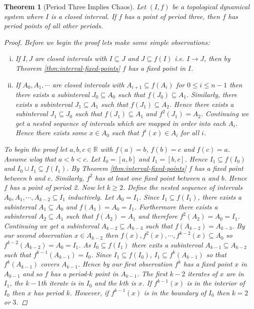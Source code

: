 \documentclass[11pt,a4paper,oneside]{memoir}
\theoremstyle{plain}
\newtheorem{thm}{Theorem}[chapter]
\theoremstyle{definition}
\begin{document}
\begin{thm}[Period Three Implies Chaos] \label{thm:period-three-chaos}
    Let $(I, f)$ be a topological dynamical system where $I$ is a closed interval. If $f$ has a point of period three, then $f$ has period points of all other periods.
    \begin{proof}
        Before we begin the proof lets make some simple observations:
        \begin{enumerate}[(i)]
            \item If $I, J$ are closed intervals with $I \subseteq J$ and $J \subseteq f(I)$ i.e. $I \to J$, then by Theorem \ref{thm:interval-fixed-points} $f$ has a fixed point in $I$.
            \item If $A_0, A_1, \cdots$ are closed intervals with $A_{i+1} \subseteq f(A_i)$ for $0 \leq i \leq n - 1$ then there exists a subinterval $J_0 \subseteq A_0$ such that $f(J_0) \subseteq A_1$. Similarly, there exists a subinterval $J_1 \subseteq A_1$ such that $f(J_1) \subseteq A_2$. Hence there exists a subinterval $J_1 \subseteq J_0$ such that $f(J_1) \subseteq A_1$ and $f^2(J_1) = A_2$. Continuing we get a nested sequence of intervals which are mapped in order into each $A_i$. Hence there exists some $x \in A_0$ such that $f^i(x) \in A_i$ for all $i$.
        \end{enumerate}
        To begin the proof let $a, b, c \in \mathbb{R}$ with $f(a) = b$, $f(b) = c$ and $f(c) = a$. Assume wlog that $a < b < c$. Let $I_0 = [a,b]$ and $I_1 = [b,c]$. Hence $I_1 \subseteq f(I_0)$ and $I_0 \cup I_1 \subseteq f(I_1)$. By Theorem \ref{thm:interval-fixed-points} $f$ has a fixed point between $b$ and $c$. Similarly, $f^2$ has at least one fixed point between $a$ and $b$. Hence $f$ has a point of period 2. Now let $k \geq 2$. Define the nested sequence of intervals $A_0, A_1, \cdots, A_{k-2} \subseteq I_1$ inductively. Let $A_0 = I_1$. Since $I_1 \subseteq f(I_1)$, there exists a subinterval $A_1 \subseteq A_0$ and $f(A_1) = A_0 = I_1$. Furthermore there exists a subinterval $A_2 \subseteq A_1$ such that $f(A_2) = A_1$ and therefore $f^2(A_2) = A_0 = I_1$. Continuing we get a subinterval $A_{k-2} \subseteq A_{k-3}$ such that $f(A_{k-2}) = A_{k-3}$. By our second observation $x \in A_{k-2}$ then $f(x), f^2(x), \cdots, f^{k-2}(x) \subseteq A_0$ so $f^{k-2}(A_{k-2}) = A_0 = I_1$. As $I_0 \subseteq f(I_1)$ there exits a subinterval $A_{k-1} \subseteq A_{k-2}$ such that $f^{k-1}(A_{k-1}) = I_0$. Since $I_1 \subseteq f(I_0)$, $I_1 \subseteq f^k(A_{k-1})$ so that $f^k(A_{k-1})$ covers $A_{k-1}$. Hence by our first observation $f^k$ has a fixed point $x$ in $A_{k-1}$ and so $f$ has a period-$k$ point in $A_{k-1}$. The first $k-2$ iterates of $x$ are in $I_1$, the $k-1$th iterate is in $I_0$ and the $k$th is $x$. If $f^{k-1}(x)$ is in the interior of $I_0$ then $x$ has period $k$. However, if $f^{k-1}(x)$ is in the boundary of $I_0$ then $k = 2$ or $3$.
    \end{proof}


\end{thm}
\end{document}
